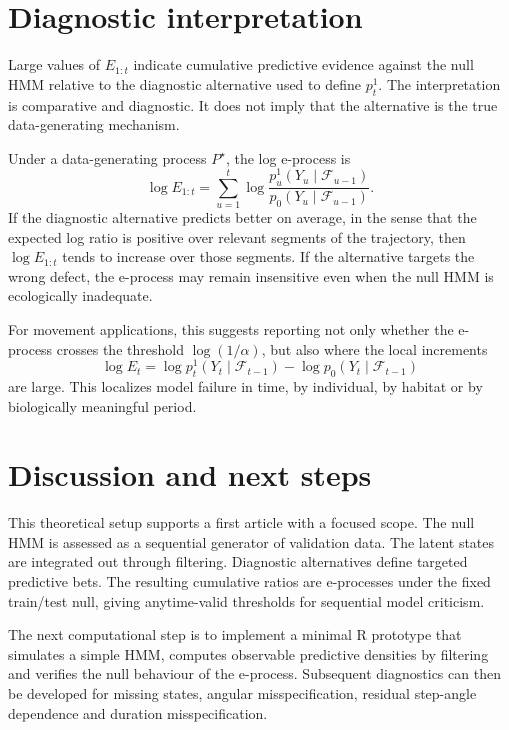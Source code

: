\documentclass[11pt]{article}
\begin{document}
\section{Diagnostic interpretation}

Large values of $E_{1:t}$ indicate cumulative predictive evidence against the null HMM relative to the diagnostic alternative used to define $p_t^1$. The interpretation is comparative and diagnostic. It does not imply that the alternative is the true data-generating mechanism.

Under a data-generating process $P^\star$, the log e-process is
\begin{equation}
\log E_{1:t}
=
\sum_{u=1}^t
\log
\frac{p_u^1(Y_u \mid \mathcal F_{u-1})}
{p_0(Y_u \mid \mathcal F_{u-1})}.
\end{equation}
If the diagnostic alternative predicts better on average, in the sense that the expected log ratio is positive over relevant segments of the trajectory, then $\log E_{1:t}$ tends to increase over those segments. If the alternative targets the wrong defect, the e-process may remain insensitive even when the null HMM is ecologically inadequate.

For movement applications, this suggests reporting not only whether the e-process crosses the threshold $\log(1/\alpha)$, but also where the local increments
\begin{equation}
\log E_t = \log p_t^1(Y_t \mid \mathcal F_{t-1}) - \log p_0(Y_t \mid \mathcal F_{t-1})
\end{equation}
are large. This localizes model failure in time, by individual, by habitat or by biologically meaningful period.

\section{Discussion and next steps}

This theoretical setup supports a first article with a focused scope. The null HMM is assessed as a sequential generator of validation data. The latent states are integrated out through filtering. Diagnostic alternatives define targeted predictive bets. The resulting cumulative ratios are e-processes under the fixed train/test null, giving anytime-valid thresholds for sequential model criticism.

The next computational step is to implement a minimal R prototype that simulates a simple HMM, computes observable predictive densities by filtering and verifies the null behaviour of the e-process. Subsequent diagnostics can then be developed for missing states, angular misspecification, residual step-angle dependence and duration misspecification.



\end{document}
